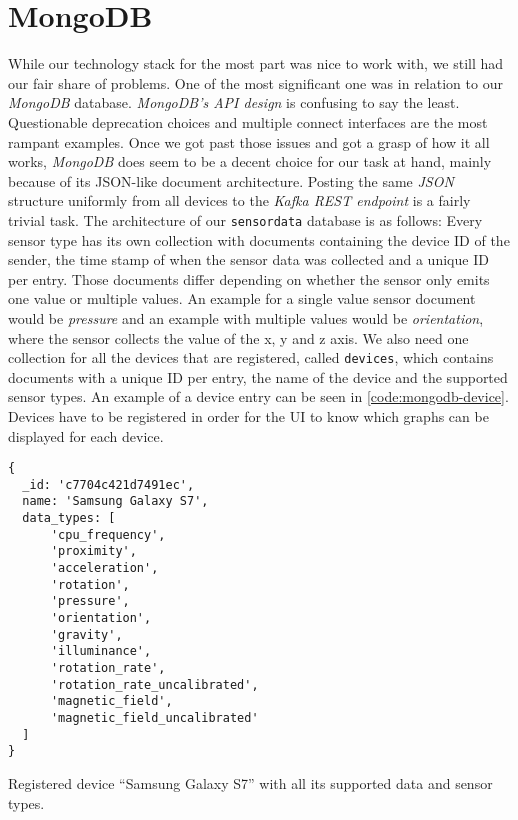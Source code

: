 \section{MongoDB}

While our technology stack for the most part was nice to work with, we still had our fair share of
problems. One of the most significant one was in relation to our \textit{MongoDB} database.
\textit{MongoDB’s API design} is confusing to say the least. Questionable deprecation choices and
multiple connect interfaces are the most rampant examples. Once we got past those issues and got a
grasp of how it all works, \textit{MongoDB} does seem to be a decent choice for our task at hand,
mainly because of its JSON-like document architecture. Posting the same \textit{JSON} structure
uniformly from all devices to the \textit{Kafka REST endpoint} is a fairly trivial task. The
architecture of our \texttt{sensordata} database is as follows: Every sensor type has its own
collection with documents containing the device ID of the sender, the time stamp of when the sensor
data was collected and a unique ID per entry. Those documents differ depending on whether the sensor
only emits one value or multiple values. An example for a single value sensor document would be
\textit{pressure} and an example with multiple values would be \textit{orientation}, where the
sensor collects the value of the x, y and z axis. We also need one collection for all the devices
that are registered, called \texttt{devices}, which contains documents with a unique ID per entry,
the name of the device and the supported sensor types. An example of a device entry can be seen in
\autoref{code:mongodb-device}. Devices have to be registered in order for the UI to know
which graphs can be displayed for each device.

\begin{code}[H]
  \centering
  \begin{lstlisting}[language=mongo]
{
  _id: 'c7704c421d7491ec',
  name: 'Samsung Galaxy S7',
  data_types: [
      'cpu_frequency',
      'proximity',
      'acceleration',
      'rotation',
      'pressure',
      'orientation',
      'gravity',
      'illuminance',
      'rotation_rate',
      'rotation_rate_uncalibrated',
      'magnetic_field',
      'magnetic_field_uncalibrated'
  ]
}
  \end{lstlisting}
  \caption{Registered device “Samsung Galaxy S7” with all its supported data and sensor types.}
  \label{code:mongodb-device}
\end{code}
